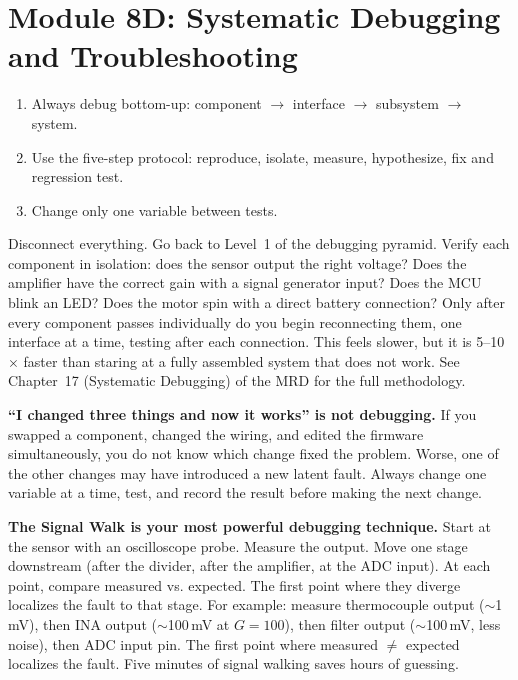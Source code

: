 \documentclass[11pt,letterpaper]{article}
\begin{document}
\section{Module 8D: Systematic Debugging and Troubleshooting}

\begin{priorities}
\begin{enumerate}[leftmargin=*, itemsep=1pt, topsep=0pt]
    \item Always debug bottom-up: component $\to$ interface $\to$ subsystem $\to$ system.
    \item Use the five-step protocol: reproduce, isolate, measure, hypothesize, fix and regression test.
    \item Change only one variable between tests.
\end{enumerate}
\end{priorities}

\begin{faqbox}
Disconnect everything. Go back to Level~1 of the debugging pyramid. Verify each component in isolation: does the sensor output the right voltage? Does the amplifier have the correct gain with a signal generator input? Does the MCU blink an LED? Does the motor spin with a direct battery connection? Only after every component passes individually do you begin reconnecting them, one interface at a time, testing after each connection. This feels slower, but it is 5--10$\times$ faster than staring at a fully assembled system that does not work. See Chapter~17 (Systematic Debugging) of the MRD for the full methodology.
\end{faqbox}

\begin{warnbox}
\textbf{``I changed three things and now it works'' is not debugging.} If you swapped a component, changed the wiring, and edited the firmware simultaneously, you do not know which change fixed the problem. Worse, one of the other changes may have introduced a new latent fault. Always change one variable at a time, test, and record the result before making the next change.
\end{warnbox}

\begin{tipbox}
\textbf{The Signal Walk is your most powerful debugging technique.} Start at the sensor with an oscilloscope probe. Measure the output. Move one stage downstream (after the divider, after the amplifier, at the ADC input). At each point, compare measured vs. expected. The first point where they diverge localizes the fault to that stage. For example: measure thermocouple output ($\sim$1\,mV), then INA output ($\sim$100\,mV at $G=100$), then filter output ($\sim$100\,mV, less noise), then ADC input pin. The first point where measured $\neq$ expected localizes the fault. Five minutes of signal walking saves hours of guessing.
\end{tipbox}
\end{document}
